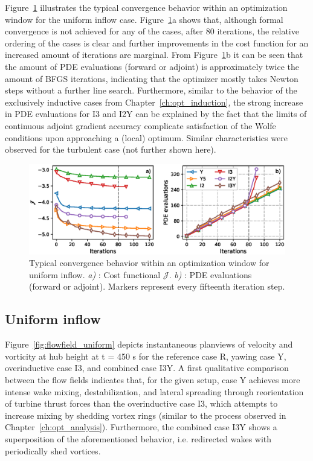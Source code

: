 Figure~\ref{fig:convergence} illustrates the typical convergence behavior within an optimization window for the uniform inflow case. Figure~\ref{fig:convergence}a shows that, although formal convergence is not achieved for any of the cases, after 80 iterations, the relative ordering of the cases is clear and further improvements in the cost function for an increased amount of iterations are marginal. From Figure~\ref{fig:convergence}b it can be seen that the amount of PDE evaluations (forward or adjoint) is approximately twice the amount of BFGS iterations, indicating that the optimizer mostly takes Newton steps without a further line search. Furthermore, similar to the behavior of the exclusively inductive cases from Chapter~\ref{ch:opt_induction}, the strong increase in PDE evaluations for I3 and I2Y can be explained by the fact that the limits of continuous adjoint gradient accuracy complicate satisfaction of the Wolfe conditions upon approaching a (local) optimum. Similar characteristics were observed for the turbulent case (not further shown here).

\begin{figure}
	\includegraphics[width=\textwidth]{chapters/optimal_yaw_control/convergence_cost_pde.eps}
	\caption[Typical convergence behavior within an optimization window for uniform inflow.]{Typical convergence behavior within an optimization window for uniform inflow. \emph{a) }: Cost functional $\mathscr{J}$. \emph{b) }: PDE evaluations (forward or adjoint). Markers represent every fifteenth iteration step.\label{fig:convergence}}
\end{figure}

\subsection{Uniform inflow}\label{sec:opt_yaw_uniform}

	Figure~\ref{fig:flowfield_uniform} depicts instantaneous planviews of velocity and vorticity at hub height at t = 450 s for the reference case R, yawing case Y, overinductive case I3, and combined case I3Y. A first qualitative comparison between the flow fields indicates that, for the given setup, case Y achieves more intense wake mixing, destabilization, and lateral spreading through reorientation of turbine thrust forces than the overinductive case I3, which attempts to increase mixing by shedding vortex rings (similar to the process observed in Chapter~\ref{ch:opt_analysis}). Furthermore, the combined case I3Y shows a superposition of the aforementioned behavior, i.e. redirected wakes with periodically shed vortices. 
	
